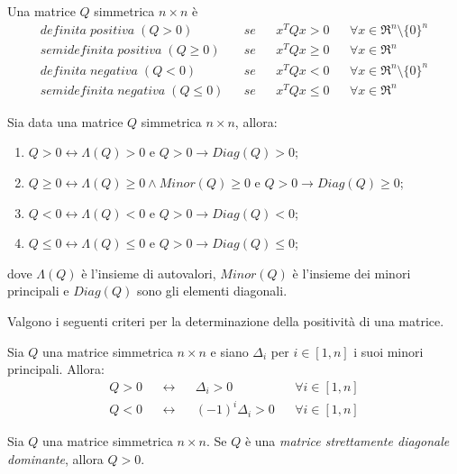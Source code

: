 \begin{definition}
	\label{dfn:positivity-negativity-matrix}
	Una matrice $Q$ simmetrica $n\times n$ è
	\begin{align}
	definita\; positiva\; (Q>0)               && se && x^{T}Qx>0     && \forall x\in\Re^{n}\setminus \{0\}^{n} \\
	semidefinita\; positiva\; (Q\geq 0)       && se && x^{T}Qx\geq 0 && \forall x\in\Re^{n} \\
	definita\; negativa\; (Q<0)               && se && x^{T}Qx<0     && \forall x\in\Re^{n}\setminus \{0\}^{n} \\
	semidefinita\; negativa\; (Q\leq 0)       && se && x^{T}Qx\leq 0 && \forall x\in\Re^{n}
	\end{align}
\end{definition}

Sia data una matrice $Q$ simmetrica $n\times n$, allora:

\begin{enumerate}
	\item $Q>0\leftrightarrow \Lambda(Q)>0$ e $Q>0\rightarrow Diag(Q)>0$;
	\item $Q\geq0\leftrightarrow \Lambda(Q)\geq0 \wedge Minor(Q)\geq0$ e $Q>0\rightarrow Diag(Q)\geq0$;
	\item $Q<0\leftrightarrow \Lambda(Q)<0$ e $Q>0\rightarrow Diag(Q)<0$;
	\item $Q\leq0\leftrightarrow \Lambda(Q)\leq0$ e $Q>0\rightarrow Diag(Q)\leq0$;
\end{enumerate}

dove $\Lambda(Q)$ è l'insieme di autovalori, $Minor(Q)$ è l'insieme dei minori principali e $Diag(Q)$ sono gli elementi diagonali.

Valgono i seguenti criteri per la determinazione della positività di una matrice.

\begin{theorem}
	\label{thm:sylvester-criterion}
	Sia $Q$ una matrice simmetrica $n\times n$ e siano $\Delta_{i}$ per $i\in[1,n]$ i suoi minori principali. Allora:
	\begin{align}
		\label{eqn:sylvester-criterion}
		Q>0 && \leftrightarrow && \Delta_{i}>0         && \forall i\in[1,n] \\
		Q<0 && \leftrightarrow && (-1)^{i}\Delta_{i}>0 &&\forall i\in[1,n]
	\end{align}
\end{theorem}

\begin{theorem}
	\label{thm:dominance-criterion}
	Sia $Q$ una matrice simmetrica $n\times n$. Se $Q$ è una \textit{matrice strettamente diagonale dominante}, allora $Q>0$.
\end{theorem}

